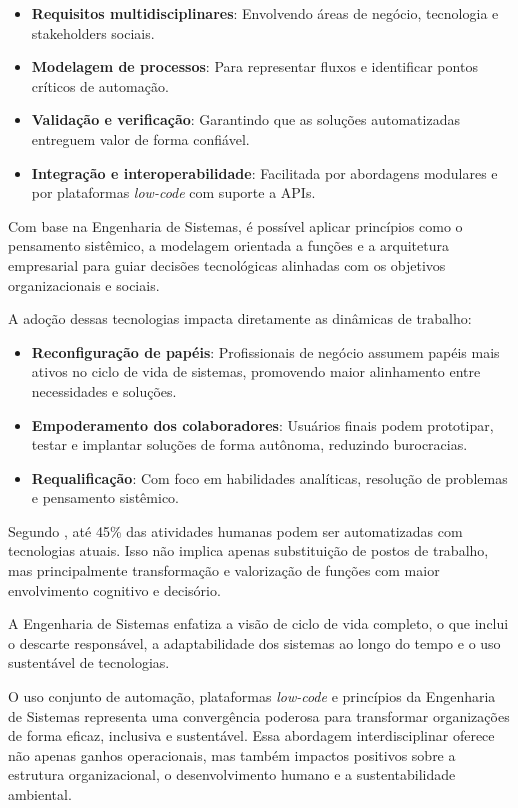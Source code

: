 \begin{itemize}
	\item \textbf{Requisitos multidisciplinares}: Envolvendo áreas de negócio, tecnologia e stakeholders sociais.
	\item \textbf{Modelagem de processos}: Para representar fluxos e identificar pontos críticos de automação.
	\item \textbf{Validação e verificação}: Garantindo que as soluções automatizadas entreguem valor de forma confiável.
	\item \textbf{Integração e interoperabilidade}: Facilitada por abordagens modulares e por plataformas \textit{low-code} com suporte a APIs.
\end{itemize}

Com base na Engenharia de Sistemas, é possível aplicar princípios como o pensamento sistêmico, a modelagem orientada a funções e a arquitetura empresarial para guiar decisões tecnológicas alinhadas com os objetivos organizacionais e sociais.

A adoção dessas tecnologias impacta diretamente as dinâmicas de trabalho:

\begin{itemize}
	\item \textbf{Reconfiguração de papéis}: Profissionais de negócio assumem papéis mais ativos no ciclo de vida de sistemas, promovendo maior alinhamento entre necessidades e soluções.
	\item \textbf{Empoderamento dos colaboradores}: Usuários finais podem prototipar, testar e implantar soluções de forma autônoma, reduzindo burocracias.
	\item \textbf{Requalificação}: Com foco em habilidades analíticas, resolução de problemas e pensamento sistêmico.
\end{itemize}

Segundo \cite{mcKinseyAutomation}, até 45\% das atividades humanas podem ser automatizadas com tecnologias atuais. Isso não implica apenas substituição de postos de trabalho, mas principalmente transformação e valorização de funções com maior envolvimento cognitivo e decisório.

A Engenharia de Sistemas enfatiza a visão de ciclo de vida completo, o que inclui o descarte responsável, a adaptabilidade dos sistemas ao longo do tempo e o uso sustentável de tecnologias.

O uso conjunto de automação, plataformas \textit{low-code} e princípios da Engenharia de Sistemas representa uma convergência poderosa para transformar organizações de forma eficaz, inclusiva e sustentável. Essa abordagem interdisciplinar oferece não apenas ganhos operacionais, mas também impactos positivos sobre a estrutura organizacional, o desenvolvimento humano e a sustentabilidade ambiental.

